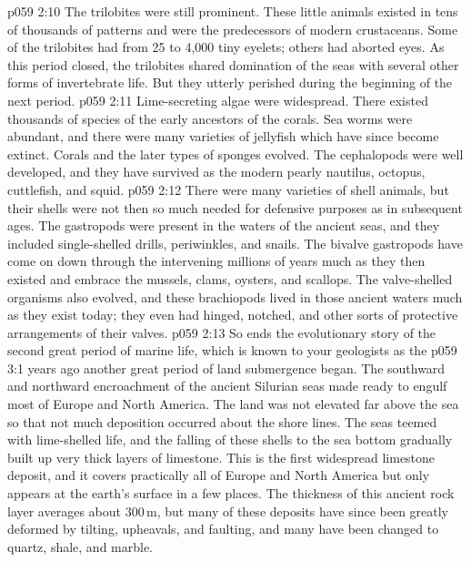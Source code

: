 \vs p059 2:10 The trilobites were still prominent. These little animals existed in tens of thousands of patterns and were the predecessors of modern crustaceans. Some of the trilobites had from 25 to 4,000 tiny eyelets; others had aborted eyes. As this period closed, the trilobites shared domination of the seas with several other forms of invertebrate life. But they utterly perished during the beginning of the next period.
\vs p059 2:11 Lime\hyp{}secreting algae were widespread. There existed thousands of species of the early ancestors of the corals. Sea worms were abundant, and there were many varieties of jellyfish which have since become extinct. Corals and the later types of sponges evolved. The cephalopods were well developed, and they have survived as the modern pearly nautilus, octopus, cuttlefish, and squid.
\vs p059 2:12 There were many varieties of shell animals, but their shells were not then so much needed for defensive purposes as in subsequent ages. The gastropods were present in the waters of the ancient seas, and they included single\hyp{}shelled drills, periwinkles, and snails. The bivalve gastropods have come on down through the intervening millions of years much as they then existed and embrace the mussels, clams, oysters, and scallops. The valve\hyp{}shelled organisms also evolved, and these brachiopods lived in those ancient waters much as they exist today; they even had hinged, notched, and other sorts of protective arrangements of their valves.
\vs p059 2:13 \pc So ends the evolutionary story of the second great period of marine life, which is known to your geologists as the 
\vs p059 3:1  years ago another great period of land submergence began. The southward and northward encroachment of the ancient Silurian seas made ready to engulf most of Europe and North America. The land was not elevated far above the sea so that not much deposition occurred about the shore lines. The seas teemed with lime\hyp{}shelled life, and the falling of these shells to the sea bottom gradually built up very thick layers of limestone. This is the first widespread limestone deposit, and it covers practically all of Europe and North America but only appears at the earth’s surface in a few places. The thickness of this ancient rock layer averages about 300\,m, but many of these deposits have since been greatly deformed by tilting, upheavals, and faulting, and many have been changed to quartz, shale, and marble.
